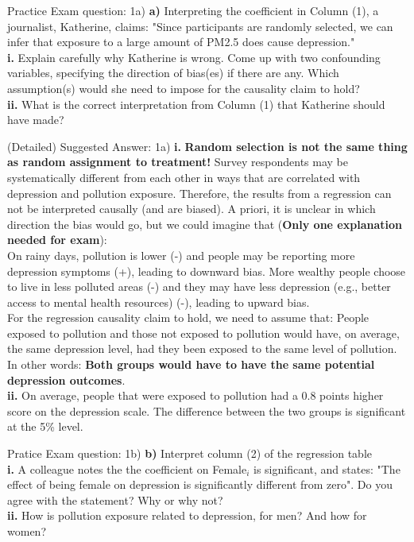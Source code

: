 \documentclass[11pt]{beamer}
\begin{document}
\begin{frame}{Practice Exam question: 1a)}
   \textbf{a)} Interpreting the coefficient in Column (1), a journalist, Katherine, claims: "Since participants are randomly selected, we can infer that exposure to a large amount of PM2.5 does cause depression." \\
\textbf{i.} Explain carefully why Katherine is wrong. Come up with two confounding variables, specifying the direction of bias(es) if there are any. Which assumption(s) would she need to impose for the causality claim to hold? \\
\textbf{ii.} What is the correct interpretation from Column (1) that Katherine should have made?
\end{frame}


\begin{frame}{(Detailed) Suggested Answer: 1a)}
\footnotesize{
\textbf{i.} \textbf{ Random selection is not the same thing as random assignment to treatment!} Survey respondents may be systematically different from each other in ways that are correlated with depression and pollution exposure. Therefore, the results from a regression can not be interpreted causally (and are biased). A priori, it is unclear in which direction the bias would go, but we could imagine that (\textbf{Only one explanation needed for exam}):\\
On rainy days, pollution is lower (-) and people may be reporting more depression symptoms (+), leading to downward bias.
More wealthy people choose to live in less polluted areas (-) and they may have less depression (e.g., better access to mental health resources) (-), leading to upward bias.\\

For the regression causality claim to hold, we need to assume that:
People exposed to pollution and those not exposed to pollution would have, on average, the same depression level, had they been exposed to the same level of pollution. In other words: \textbf{Both groups would have to have the same potential depression outcomes}.\\

\textbf{ii.} On average, people that were exposed to pollution had a 0.8 points higher score on the depression scale. The difference between the two groups is significant at the 5\% level.
}
\end{frame}





\begin{frame}{Pratice Exam question: 1b)}
   \textbf{b)} Interpret column (2) of the regression table \\
\textbf{i.} A colleague notes the the coefficient on Female$_i$ is significant, and states: "The effect of being female on depression is significantly different from zero". Do you agree with the statement? Why or why not? \\
\textbf{ii.} How is pollution exposure related to depression, for men? And how for women?
\end{frame}
\end{document}
